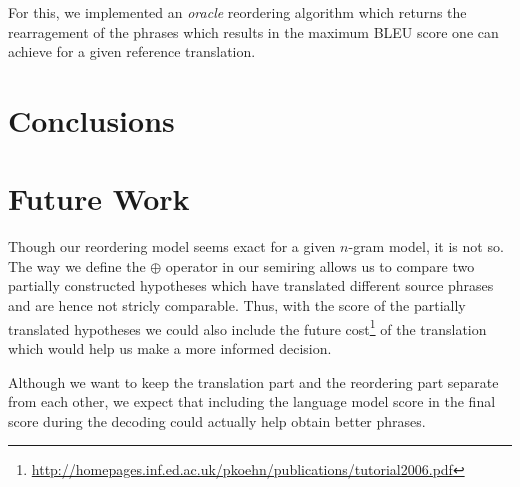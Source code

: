 \documentclass[11pt]{article}
\numberwithin{equation}{section}
\begin{document}
For this, we implemented an \textit{oracle} reordering algorithm which returns the rearragement of the phrases
which results in the maximum BLEU score one can achieve for a given reference translation.


\section{Conclusions}
\label{sec:conclusions}

\section{Future Work}

Though our reordering model seems exact for a given $n$-gram model, it is not so. The way we define the $\oplus$ operator
in our semiring allows us to compare two partially constructed hypotheses which have translated different source phrases
and are hence not stricly comparable. Thus, with the score of the partially translated hypotheses we could also include
the future cost\footnote{\url{http://homepages.inf.ed.ac.uk/pkoehn/publications/tutorial2006.pdf}} of the translation which would help 
us make a more informed decision.

Although we want to keep the translation part and the reordering part separate from each other, we expect that including the language 
model score in the final score during the decoding could actually help obtain better phrases.



\end{document}
